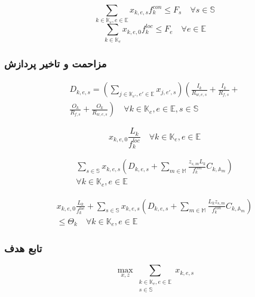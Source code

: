 \begin{equation}
    \sum_{k \in \mathbb{K}_e,e \in \mathbb{E}} x_{k,e,s} f^{con}_k \leq F_s \quad \forall s \in \mathbb{S}
\end{equation}
\begin{equation}
    \sum_{k \in \mathbb{K}_e} x_{k,e,0} f^{loc}_k \leq F_e \quad \forall e \in \mathbb{E}
\end{equation}

\subsubsection{مزاحمت و تاخیر پردازش}

\begin{multline} \label{transmission_delay}
    D_{k,e,s} = \left(\sum_{j \in \mathbb{K}_{e'}, e' \in \mathbb{E}} x_{j,e',s}\right) \left(\frac{I_k}{R_{w,e,s}} + \frac{I_k}{R_{f,s}} + \right. \\ \left. \frac{O_k}{R_{f,s}} + \frac{O_k}{R_{w,e,s}} \right) \quad \forall k \in \mathbb{K}_e, e \in \mathbb{E}, s \in \mathbb{S}
\end{multline}

\begin{equation}\label{local_exec_time}
    x_{k,e,0}\frac{L_k}{f^{loc}_k} \quad \forall k \in \mathbb{K}_e, e \in \mathbb{E}
\end{equation}

\begin{multline}
    \sum_{s \in \mathbb{S}} x_{k,e,s} \left(D_{k,e,s} + \sum_{m \in \mathbb{M}} \frac{z_{s,m} L_k}{f^{con}_k} C_{k,\mathbb{A}_m}\right) \\ \forall k \in \mathbb{K}_e, e \in \mathbb{E}
\end{multline} \label{off_time}

\begin{multline} \label{latency_con}
    x_{k,e,0}\frac{L_k}{f^{loc}_k} + \sum_{s \in \mathbb{S}} x_{k,e,s} \left(D_{k,e,s} + \sum_{m \in \mathbb{M}}\frac{L_k z_{s,m}}{f^{con}_k} C_{k,\mathbb{A}_m}\right) \\ \leq \Theta_k \quad \forall k \in \mathbb{K}_e, e \in \mathbb{E}
\end{multline}

\subsubsection{تابع هدف}

\begin{equation}
    \max_{x,z} \sum_{\substack{k \in \mathbb{K}_e, e \in \mathbb{E}\\ s \in \mathbb{S}}} x_{k,e,s}
\end{equation}

